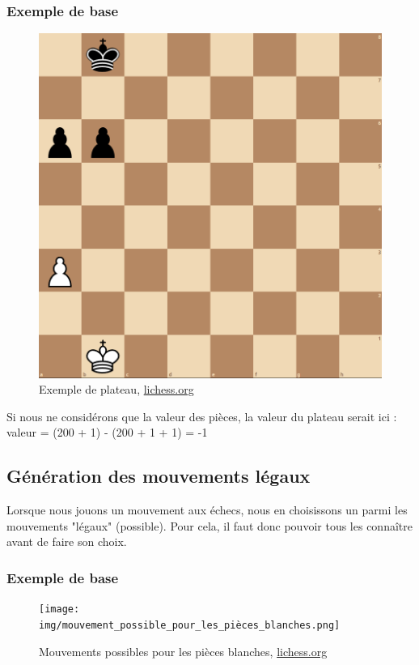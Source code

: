 \documentclass{article}
\begin{document}
\subsubsection{Exemple de base}
\begin{figure}[h]
\centering
\includegraphics[scale=0.25]{img/base_heuristic.png}
\caption{Exemple de plateau, 
\href{https://lichess.org/editor/}{lichess.org}}
\end{figure}
Si nous ne considérons que la valeur des pièces, la valeur du plateau serait ici : \newline
valeur = (200 + 1) - (200 + 1 + 1) = -1 
\subsection{Génération des mouvements légaux}\label{legal_move_1.4}
Lorsque nous jouons un mouvement aux échecs, nous en choisissons un parmi les mouvements "légaux" (possible). Pour cela, il faut donc pouvoir tous les connaître avant de faire son choix.
\subsubsection{Exemple de base}
    \begin{figure}[h]
    \centering
    \texttt{[image: img/mouvement\_possible\_pour\_les\_pièces\_blanches.png]}
    \caption{Mouvements possibles pour les pièces blanches, \href{https://lichess.org/editor/7k/8/8/8/2R1P3/8/8/6K1_w_-_-_0_1}{lichess.org}}
    \end{figure}
\newpage
\end{document}
